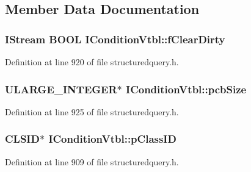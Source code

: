 \subsection{Member Data Documentation}
\subsubsection[{\texorpdfstring{f\+Clear\+Dirty}{fClearDirty}}]{ I\+Stream {\bf B\+O\+OL} I\+Condition\+Vtbl\+::f\+Clear\+Dirty}\hypertarget{struct_i_condition_vtbl_a5f41e1ab9a3f04dec7adff83ae072768}{}\label{struct_i_condition_vtbl_a5f41e1ab9a3f04dec7adff83ae072768}


Definition at line 920 of file structuredquery.\+h.

\subsubsection[{\texorpdfstring{pcb\+Size}{pcbSize}}]{ U\+L\+A\+R\+G\+E\+\_\+\+I\+N\+T\+E\+G\+ER$\ast$ I\+Condition\+Vtbl\+::pcb\+Size}\hypertarget{struct_i_condition_vtbl_a7a922f64ccebbc2ccdf4935c638e9e47}{}\label{struct_i_condition_vtbl_a7a922f64ccebbc2ccdf4935c638e9e47}


Definition at line 925 of file structuredquery.\+h.

\subsubsection[{\texorpdfstring{p\+Class\+ID}{pClassID}}]{ C\+L\+S\+ID$\ast$ I\+Condition\+Vtbl\+::p\+Class\+ID}\hypertarget{struct_i_condition_vtbl_afe94483f5c328cd3667db0549dd55267}{}\label{struct_i_condition_vtbl_afe94483f5c328cd3667db0549dd55267}


Definition at line 909 of file structuredquery.\+h.

